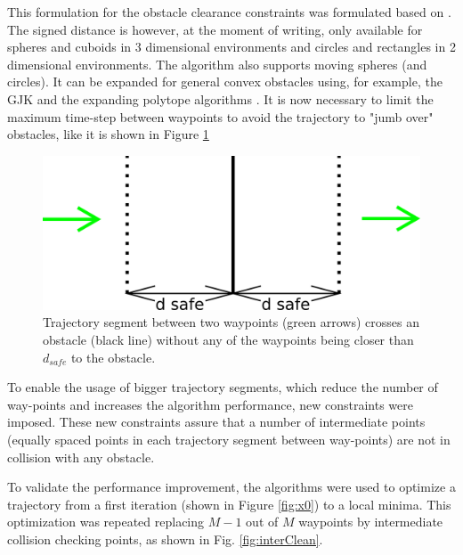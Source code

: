 This formulation for the obstacle clearance constraints was formulated based on \cite{ref:SeqConvexOpt}. The signed distance is however, at the moment of writing, only available for spheres and cuboids in 3 dimensional environments and circles and rectangles in 2 dimensional environments. The algorithm also supports moving spheres (and circles). It can be expanded for general convex obstacles using, for example, the GJK and the expanding polytope algorithms \cite{GJK} \cite{EPA}. It is now necessary to limit the maximum time-step between waypoints to avoid the trajectory to "jumb over" obstacles, like it is shown in Figure \ref{fig:maxT}

\begin{figure}[H]
    \centering
    \includegraphics[width=0.8\linewidth]{Figures/05_optimization/maxT.png}
    \caption{Trajectory segment between two waypoints (green arrows) crosses an obstacle (black line) without any of the waypoints being closer than $d_{safe}$ to the obstacle.}
    \label{fig:maxT}
\end{figure}

\par
To enable the usage of bigger trajectory segments, which reduce the number of way-points and increases the algorithm performance, new constraints were imposed. These new constraints assure that a number of intermediate points (equally spaced points in each trajectory segment between way-points) are not in collision with any obstacle. 
\par
To validate the performance improvement, the algorithms were used to optimize a trajectory from a first iteration (shown in Figure \ref{fig:x0}) to a local minima. This optimization was repeated replacing $M-1$ out of $M$ waypoints by intermediate collision checking points, as shown in Fig. \ref{fig:interClean}. 

